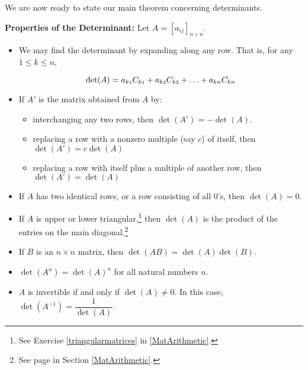 \documentclass{ximera}
\begin{document}
We are now ready to state our main theorem concerning determinants.

\smallskip


\begin{theorem} \label{determinantprops}  \textbf{Properties of the Determinant:} Let $A = \left[a_{ij}\right]_{n \times n}$.  

\begin{itemize}

\item  We may find the determinant by expanding along any row.  That is, for any $1 \leq k \leq n$, 

\[\det(A) = a_{k\mbox{\tiny$1$}}C_{k\mbox{\tiny$1$}} +  a_{k\mbox{\tiny$2$}}C_{k\mbox{\tiny$2$}} + \ldots + a_{kn} C_{kn}\]

\item  If $A'$ is the matrix obtained from $A$ by:

\begin{itemize}

\item interchanging any two rows, then $\det(A')=-\det(A)$.

\item  replacing a row with a nonzero multiple (say $c$) of itself, then $\det(A')=c\det(A)$

\item  replacing a row with itself plus a multiple of another row, then $\det(A')=\det(A)$

\end{itemize}

\item  If $A$ has two identical rows, or a row consisting of all $0$'s, then $\det(A) = 0$.

\item  If $A$ is upper or lower triangular,\footnote{See Exercise \ref{triangularmatrices} in \ref{MatArithmetic}.} then $\det(A)$ is the product of the entries on the main diagonal.\footnote{See page \pageref{maindiagonal} in Section \ref{MatArithmetic}.}

\item  If $B$ is an $n \times n$ matrix, then $\det(AB) = \det(A) \det(B)$.

\item  $\det\left(A^{n}\right) = \det(A)^{n}$ for all natural numbers $n$.

\item  $A$ is invertible if and only if $\det(A) \neq 0$.  In this case, $\det\left(A^{-1}\right) = \dfrac{1}{\det(A)}$.

\end{itemize}

\end{theorem}
\end{document}
